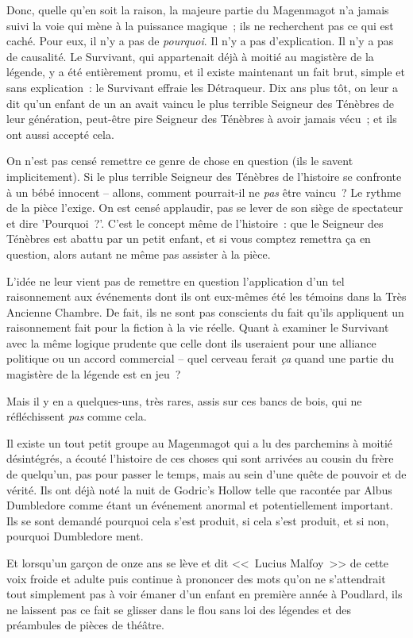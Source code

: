 Donc, quelle qu'en soit la raison, la majeure partie du Magenmagot n'a jamais suivi la voie qui mène à la puissance magique~; ils ne recherchent pas ce qui est caché. Pour eux, il n'y a pas de \emph{pourquoi}. Il n'y a pas d'explication. Il n'y a pas de causalité. Le Survivant, qui appartenait déjà à moitié au magistère de la légende, y a été entièrement promu, et il existe maintenant un fait brut, simple et sans explication~: le Survivant effraie les Détraqueur. Dix ans plus tôt, on leur a dit qu'un enfant de un an avait vaincu le plus terrible Seigneur des Ténèbres de leur génération, peut-être pire Seigneur des Ténèbres à avoir jamais vécu~; et ils ont aussi accepté cela.

On n'est pas censé remettre ce genre de chose en question (ils le savent implicitement). Si le plus terrible Seigneur des Ténèbres de l'histoire se confronte à un bébé innocent -- allons, comment pourrait-il ne \emph{pas} être vaincu~? Le rythme de la pièce l'exige. On est censé applaudir, pas se lever de son siège de spectateur et dire 'Pourquoi~?'. C'est le concept même de l'histoire~: que le Seigneur des Ténèbres est abattu par un petit enfant, et si vous comptez remettra ça en question, alors autant ne même pas assister à la pièce.

L'idée ne leur vient pas de remettre en question l'application d'un tel raisonnement aux événements dont ils ont eux-mêmes été les témoins dans la Très Ancienne Chambre. De fait, ils ne sont pas conscients du fait qu'ils appliquent un raisonnement fait pour la fiction à la vie réelle. Quant à examiner le Survivant avec la même logique prudente que celle dont ils useraient pour une alliance politique ou un accord commercial -- quel cerveau ferait \emph{ça} quand une partie du magistère de la légende est en jeu~?

Mais il y en a quelques-uns, très rares, assis sur ces bancs de bois, qui ne réfléchissent \emph{pas} comme cela.

Il existe un tout petit groupe au Magenmagot qui a lu des parchemins à moitié désintégrés, a écouté l'histoire de ces choses qui sont arrivées au cousin du frère de quelqu'un, pas pour passer le temps, mais au sein d'une quête de pouvoir et de vérité. Ils ont déjà noté la nuit de Godric's Hollow telle que racontée par Albus Dumbledore comme étant un événement anormal et potentiellement important. Ils se sont demandé pourquoi cela s'est produit, si cela s'est produit, et si non, pourquoi Dumbledore ment.

Et lorsqu'un garçon de onze ans se lève et dit <<~Lucius Malfoy~>> de cette voix froide et adulte puis continue à prononcer des mots qu'on ne s'attendrait tout simplement pas à voir émaner d'un enfant en première année à Poudlard, ils ne laissent pas ce fait se glisser dans le flou sans loi des légendes et des préambules de pièces de théâtre.

